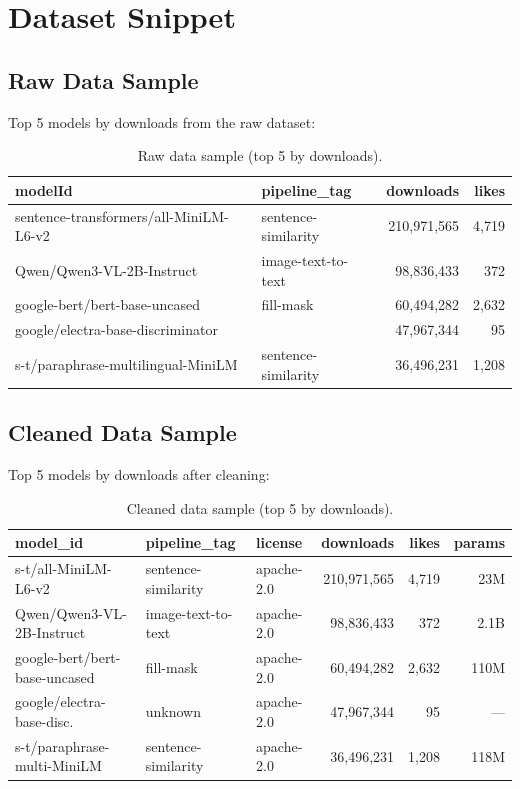 \documentclass[11pt]{article}
\begin{document}
\section{Dataset Snippet}

\subsection{Raw Data Sample}

Top 5 models by downloads from the raw dataset:

\begin{table}[H]
\centering
\small
\begin{tabular}{llrr}
\toprule
\textbf{modelId} & \textbf{pipeline\_tag} & \textbf{downloads} & \textbf{likes} \\
\midrule
sentence-transformers/all-MiniLM-L6-v2 & sentence-similarity & 210,971,565 & 4,719 \\
Qwen/Qwen3-VL-2B-Instruct             & image-text-to-text  & 98,836,433  & 372 \\
google-bert/bert-base-uncased          & fill-mask           & 60,494,282  & 2,632 \\
google/electra-base-discriminator      &                     & 47,967,344  & 95 \\
s-t/paraphrase-multilingual-MiniLM     & sentence-similarity & 36,496,231  & 1,208 \\
\bottomrule
\end{tabular}
\caption{Raw data sample (top 5 by downloads).}
\end{table}

\subsection{Cleaned Data Sample}

Top 5 models by downloads after cleaning:

\begin{table}[H]
\centering
\small
\begin{tabular}{lllrrr}
\toprule
\textbf{model\_id} & \textbf{pipeline\_tag} & \textbf{license} & \textbf{downloads} & \textbf{likes} & \textbf{params} \\
\midrule
s-t/all-MiniLM-L6-v2           & sentence-similarity & apache-2.0 & 210,971,565 & 4,719 & 23M \\
Qwen/Qwen3-VL-2B-Instruct      & image-text-to-text  & apache-2.0 & 98,836,433  & 372   & 2.1B \\
google-bert/bert-base-uncased   & fill-mask           & apache-2.0 & 60,494,282  & 2,632 & 110M \\
google/electra-base-disc.       & unknown             & apache-2.0 & 47,967,344  & 95    & --- \\
s-t/paraphrase-multi-MiniLM    & sentence-similarity & apache-2.0 & 36,496,231  & 1,208 & 118M \\
\bottomrule
\end{tabular}
\caption{Cleaned data sample (top 5 by downloads).}
\end{table}
\end{document}
